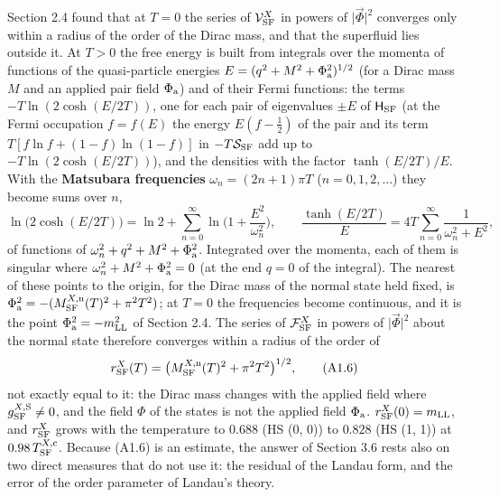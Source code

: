 \documentclass[
  10pt,
]{article}
\begin{document}
Section 2.4 found that at \(T=0\) the series of
\(\mathcal V^X_{\rm SF}\) in powers of \(\lvert\vec\Phi\rvert^2\)
converges only within a radius of the order of the Dirac mass, and that
the superfluid lies outside it. At \(T>0\) the free energy is built from
integrals over the momenta of functions of the quasi-particle energies
\(E=(q^2+M^2+\Phi_{\rm a}^2)^{1/2}\) (for a Dirac mass \(M\) and an
applied pair field \(\Phi_{\rm a}\)) and of their Fermi functions: the
terms \(-T\ln(2\cosh(E/2T))\), one for each pair of eigenvalues
\(\pm E\) of \(\mathsf H_{\rm SF}\) (at the Fermi occupation \(f=f(E)\)
the energy \(E(f-\tfrac12)\) of the pair and its term
\(T[f\ln f+(1-f)\ln(1-f)]\) in \(-T\mathcal S_{\rm SF}\) add up to
\(-T\ln(2\cosh(E/2T))\)), and the densities with the factor
\(\tanh(E/2T)/E\). With the \textbf{Matsubara frequencies}
\(\omega_n=(2n+1)\pi T\) (\(n=0,1,2,\dots\)) they become sums over
\(n\),
\[\ln\big(2\cosh(E/2T)\big)=\ln2+\sum_{n=0}^\infty\ln\Big(1+\frac{E^2}{\omega_n^2}\Big),\qquad\frac{\tanh(E/2T)}E=4T\sum_{n=0}^\infty\frac1{\omega_n^2+E^2},\]
of functions of \(\omega_n^2+q^2+M^2+\Phi_{\rm a}^2\). Integrated over
the momenta, each of them is singular where
\(\omega_n^2+M^2+\Phi_{\rm a}^2=0\) (at the end \(q=0\) of the
integral). The nearest of these points to the origin, for the Dirac mass
of the normal state held fixed, is
\(\Phi_{\rm a}^2=-(M^{X,{\rm n}}_{\rm SF}(T)^2+\pi^2T^2)\); at \(T=0\)
the frequencies become continuous, and it is the point
\(\Phi_{\rm a}^2=-m_{\rm LL}^2\) of Section 2.4. The series of
\(\mathcal F^X_{\rm SF}\) in powers of \(\lvert\vec\Phi\rvert^2\) about
the normal state therefore converges within a radius of the order of
\[r^X_{\rm SF}(T)=\big(M^{X,{\rm n}}_{\rm SF}(T)^2+\pi^2T^2\big)^{1/2},\tag{A1.6}\]
not exactly equal to it: the Dirac mass changes with the applied field
where \(g^{X,{\rm S}}_{\rm SF}\ne0\), and the field \(\Phi\) of the
states is not the applied field \(\Phi_{\rm a}\).
\(r^X_{\rm SF}(0)=m_{\rm LL}\), and \(r^X_{\rm SF}\) grows with the
temperature to \(0.688\) (HS (0, 0)) to \(0.828\) (HS (1, 1)) at
\(0.98\,T^{X,{\rm c}}_{\rm SF}\). Because (A1.6) is an estimate, the
answer of Section 3.6 rests also on two direct measures that do not use
it: the residual of the Landau form, and the error of the order
parameter of Landau's theory.
\end{document}
